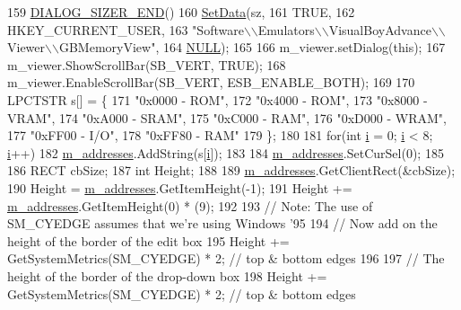 \begin{DoxyCode}
159     \mbox{\hyperlink{_resize_dlg_8h_aeac0c1e32f30e0763df5736e4b3ea50a}{DIALOG\_SIZER\_END}}()
160     \mbox{\hyperlink{class_resize_dlg_a6a3965f44a0c2f5ba9aaa798a9a81df5}{SetData}}(sz,
161             TRUE,
162             HKEY\_CURRENT\_USER,
163             "Software\(\backslash\)\(\backslash\)Emulators\(\backslash\)\(\backslash\)VisualBoyAdvance\(\backslash\)\(\backslash\)Viewer\(\backslash\)\(\backslash\)GBMemoryView",
164             \mbox{\hyperlink{getopt1_8c_a070d2ce7b6bb7e5c05602aa8c308d0c4}{NULL}});
165   
166   m\_viewer.setDialog(this);
167   m\_viewer.ShowScrollBar(SB\_VERT, TRUE);
168   m\_viewer.EnableScrollBar(SB\_VERT, ESB\_ENABLE\_BOTH);
169 
170   LPCTSTR s[] = \{
171     \textcolor{stringliteral}{"0x0000 - ROM"},
172     \textcolor{stringliteral}{"0x4000 - ROM"},
173     \textcolor{stringliteral}{"0x8000 - VRAM"},
174     \textcolor{stringliteral}{"0xA000 - SRAM"},
175     \textcolor{stringliteral}{"0xC000 - RAM"},
176     \textcolor{stringliteral}{"0xD000 - WRAM"},
177     \textcolor{stringliteral}{"0xFF00 - I/O"},
178     \textcolor{stringliteral}{"0xFF80 - RAM"}
179   \};
180 
181   \textcolor{keywordflow}{for}(\textcolor{keywordtype}{int} \mbox{\hyperlink{expr-lex_8cpp_acb559820d9ca11295b4500f179ef6392}{i}} = 0; \mbox{\hyperlink{expr-lex_8cpp_acb559820d9ca11295b4500f179ef6392}{i}} < 8; \mbox{\hyperlink{expr-lex_8cpp_acb559820d9ca11295b4500f179ef6392}{i}}++)
182     \mbox{\hyperlink{class_g_b_memory_viewer_dlg_af3cb69fc0a793bfb57e2abebbb300e4d}{m\_addresses}}.AddString(s[\mbox{\hyperlink{expr-lex_8cpp_acb559820d9ca11295b4500f179ef6392}{i}}]);
183 
184   \mbox{\hyperlink{class_g_b_memory_viewer_dlg_af3cb69fc0a793bfb57e2abebbb300e4d}{m\_addresses}}.SetCurSel(0);
185 
186   RECT cbSize;
187   \textcolor{keywordtype}{int} Height;
188   
189   \mbox{\hyperlink{class_g_b_memory_viewer_dlg_af3cb69fc0a793bfb57e2abebbb300e4d}{m\_addresses}}.GetClientRect(&cbSize);
190   Height = \mbox{\hyperlink{class_g_b_memory_viewer_dlg_af3cb69fc0a793bfb57e2abebbb300e4d}{m\_addresses}}.GetItemHeight(-1);
191   Height += \mbox{\hyperlink{class_g_b_memory_viewer_dlg_af3cb69fc0a793bfb57e2abebbb300e4d}{m\_addresses}}.GetItemHeight(0) * (9);
192   
193   \textcolor{comment}{// Note: The use of SM\_CYEDGE assumes that we're using Windows '95}
194   \textcolor{comment}{// Now add on the height of the border of the edit box}
195   Height += GetSystemMetrics(SM\_CYEDGE) * 2;  \textcolor{comment}{// top & bottom edges}
196   
197   \textcolor{comment}{// The height of the border of the drop-down box}
198   Height += GetSystemMetrics(SM\_CYEDGE) * 2;  \textcolor{comment}{// top & bottom edges}

\end{DoxyCode}
